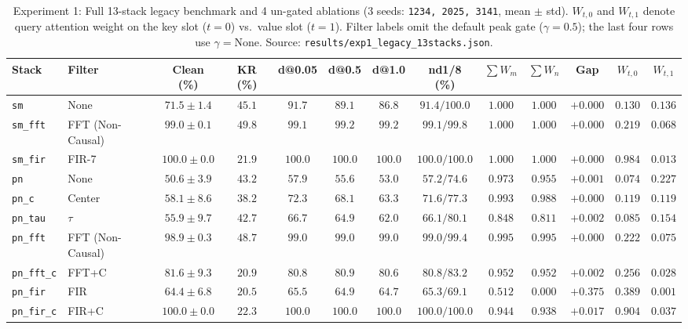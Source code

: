 \documentclass[11pt,a4paper]{article}
\begin{document}
\begin{table}[ht!]
\centering
\caption{Experiment 1: Full 13-stack legacy benchmark and 4 un-gated ablations (3 seeds: \texttt{1234, 2025, 3141}, mean $\pm$ std). $W_{t,0}$ and $W_{t,1}$ denote query attention weight on the key slot ($t=0$) vs.\ value slot ($t=1$). Filter labels omit the default peak gate ($\gamma=0.5$); the last four rows use $\gamma=\text{None}$. Source: \texttt{results/exp1\_legacy\_13stacks.json}.}
\label{tab:exp1}
\scriptsize
\setlength{\tabcolsep}{0.8pt}
\begin{tabular}{llccccccccccc}
\toprule
Stack & Filter & Clean (\%) & KR (\%) & d@0.05 & d@0.5 & d@1.0 & nd1/8 (\%) & $\sum W_m$ & $\sum W_n$ & Gap & $W_{t,0}$ & $W_{t,1}$ \\
\midrule
\texttt{sm} & None & $71.5 \pm 1.4$ & $45.1$ & $91.7$ & $89.1$ & $86.8$ & $91.4/100.0$ & $1.000$ & $1.000$ & $+0.000$ & $0.130$ & $0.136$ \\
\texttt{sm\_fft} & FFT (Non-Causal) & $99.0 \pm 0.1$ & $49.8$ & $99.1$ & $99.2$ & $99.2$ & $99.1/99.8$ & $1.000$ & $1.000$ & $+0.000$ & $0.219$ & $0.068$ \\
\texttt{sm\_fir} & FIR-7 & $\mathbf{100.0 \pm 0.0}$ & $21.9$ & $100.0$ & $100.0$ & $100.0$ & $100.0/100.0$ & $1.000$ & $1.000$ & $+0.000$ & $0.984$ & $0.013$ \\
\texttt{pn} & None & $50.6 \pm 3.9$ & $43.2$ & $57.9$ & $55.6$ & $53.0$ & $57.2/74.6$ & $0.973$ & $0.955$ & $+0.001$ & $0.074$ & $0.227$ \\
\texttt{pn\_c} & Center & $58.1 \pm 8.6$ & $38.2$ & $72.3$ & $68.1$ & $63.3$ & $71.6/77.3$ & $0.993$ & $0.988$ & $+0.000$ & $0.119$ & $0.119$ \\
\texttt{pn\_tau} & $\tau$ & $55.9 \pm 9.7$ & $42.7$ & $66.7$ & $64.9$ & $62.0$ & $66.1/80.1$ & $0.848$ & $0.811$ & $+0.002$ & $0.085$ & $0.154$ \\
\texttt{pn\_fft} & FFT (Non-Causal) & $98.9 \pm 0.3$ & $48.7$ & $99.0$ & $99.0$ & $99.0$ & $99.0/99.4$ & $0.995$ & $0.995$ & $+0.000$ & $0.222$ & $0.075$ \\
\texttt{pn\_fft\_c} & FFT+C & $81.6 \pm 9.3$ & $20.9$ & $80.8$ & $80.9$ & $80.6$ & $80.8/83.2$ & $0.952$ & $0.952$ & $+0.002$ & $0.256$ & $0.028$ \\
\texttt{pn\_fir} & FIR & $64.4 \pm 6.8$ & $20.5$ & $65.5$ & $64.9$ & $64.7$ & $65.3/69.1$ & $0.512$ & $0.000$ & $+0.375$ & $0.389$ & $0.001$ \\
\texttt{pn\_fir\_c} & FIR+C & $\mathbf{100.0 \pm 0.0}$ & $22.3$ & $100.0$ & $100.0$ & $100.0$ & $100.0/100.0$ & $0.944$ & $0.938$ & $+0.017$ & $0.904$ & $0.037$ \\

\end{tabular}
\end{table}
\end{document}
